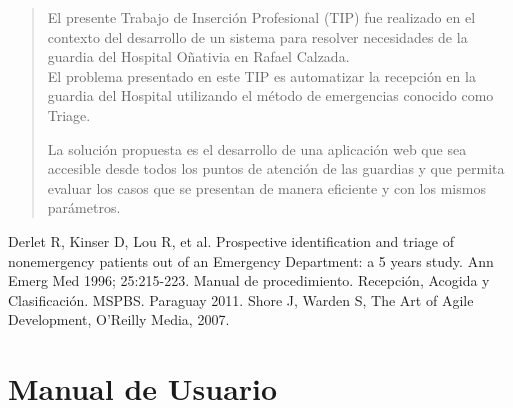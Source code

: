 \documentclass[a4paper,10pt]{article}
\begin{document}
 \makeCaratulaTIP



\newpage 
\begin{abstract}
El presente Trabajo de Inserción Profesional (TIP) fue realizado en el contexto del desarrollo de un sistema para resolver necesidades de la guardia del Hospital Oñativia en Rafael Calzada.\\ 
El problema presentado en este TIP es automatizar la recepción en la guardia del Hospital utilizando el método de emergencias conocido como Triage.
 
La solución propuesta es el desarrollo de una aplicación web que sea accesible desde todos los puntos de atención de las guardias y que permita evaluar los casos que se presentan de manera eficiente y con los mismos parámetros.

\end{abstract}


\newpage 
\tableofcontents

\newpage














\newpage 
\begin{thebibliography}{3} 
 Derlet R, Kinser D, Lou R, et al. Prospective identification and triage of nonemergency patients out of an Emergency Department: a 5 years study. Ann Emerg Med 1996; 25:215-223.
 Manual de procedimiento. Recepción,  Acogida y Clasificación.  MSPBS. Paraguay 2011.
 Shore J, Warden S, The Art of Agile Development, O’Reilly Media, 2007.

\end{thebibliography}

\newpage
\appendix
\section{Manual de Usuario}












\newpage
\end{document}
